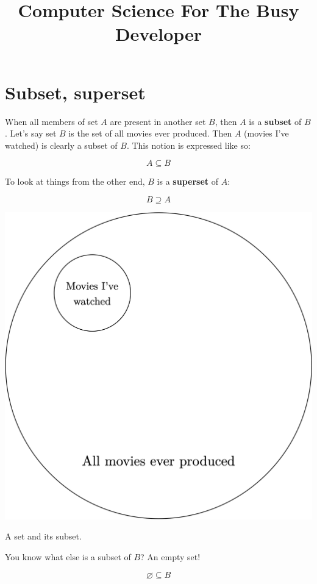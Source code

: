 \documentclass[a4paper, justified, notitlepage, sfsidenotes, notoc]{tufte-book}
\date{}
\title{Computer Science For The Busy Developer}
\begin{document}
\part{Subset, superset}
\label{sec:org25368f9}

When all members of set \(A\) are present in another set \(B\), then \(A\) is a \textbf{subset} of \(B\). Let's say set \(B\) is the set of all movies ever produced. Then \(A\) (movies I've watched) is clearly a subset of \(B\). This notion is expressed like so:

\begin{equation}
A \subseteq B
\end{equation}

To look at things from the other end, \(B\) is a \textbf{superset} of \(A\):

\begin{equation}
B \supseteq A
\end{equation}

\begin{marginfigure}
  \includegraphics[width=\linewidth]{images/subset.png}
  \caption{A set and its subset.}
  \label{fig:marginfig}
\end{marginfigure}


You know what else is a subset of \(B\)? An empty set!

\begin{equation}
\varnothing \subseteq B
\end{equation}
\end{document}
